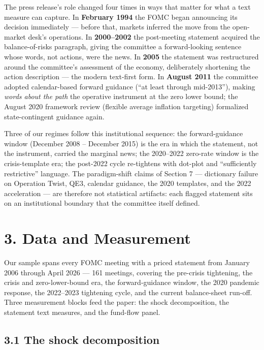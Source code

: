 The press release's role changed four times in ways that matter for what a text measure can capture. In \textbf{February 1994} the FOMC began announcing its decision immediately --- before that, markets inferred the move from the open-market desk's operations. In \textbf{2000--2002} the post-meeting statement acquired the balance-of-risks paragraph, giving the committee a forward-looking sentence whose words, not actions, were the news. In \textbf{2005} the statement was restructured around the committee's assessment of the economy, deliberately shortening the action description --- the modern text-first form. In \textbf{August 2011} the committee adopted calendar-based forward guidance (``at least through mid-2013''), making \emph{words about the path} the operative instrument at the zero lower bound; the August 2020 framework review (flexible average inflation targeting) formalized state-contingent guidance again.

Three of our regimes follow this institutional sequence: the forward-guidance window (December 2008 -- December 2015) is the era in which the statement, not the instrument, carried the marginal news; the 2020--2022 zero-rate window is the crisis-template era; the post-2022 cycle re-tightens with dot-plot and ``sufficiently restrictive'' language. The paradigm-shift claims of Section 7 --- dictionary failure on Operation Twist, QE3, calendar guidance, the 2020 templates, and the 2022 acceleration --- are therefore not statistical artifacts: each flagged statement sits on an institutional boundary that the committee itself defined.

\section{3. Data and Measurement}\label{data-and-measurement}

Our sample spans every FOMC meeting with a priced statement from January 2006 through April 2026 --- 161 meetings, covering the pre-crisis tightening, the crisis and zero-lower-bound era, the forward-guidance window, the 2020 pandemic response, the 2022--2023 tightening cycle, and the current balance-sheet run-off. Three measurement blocks feed the paper: the shock decomposition, the statement text measures, and the fund-flow panel.

\subsection{3.1 The shock decomposition}\label{the-shock-decomposition}

